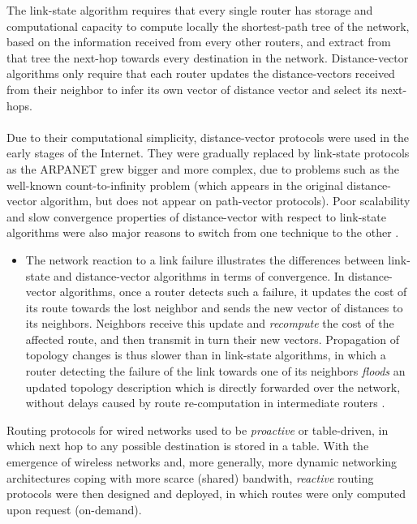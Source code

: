 The link-state algorithm requires that every single router has storage and computational capacity to compute locally the shortest-path tree of the network, based on the information received from every other routers, and extract from that tree the next-hop towards every destination in the network. Distance-vector algorithms only require that each router updates the distance-vectors received from their neighbor to infer its own vector of distance vector and select its next-hops. \ \\ \ \\
%
Due to their computational simplicity, distance-vector protocols were used in the early stages of the Internet. They were gradually replaced by link-state protocols as the ARPANET grew bigger and more complex, due to problems such as the well-known count-to-infinity problem \cite{tanenbaum} (which appears in the original distance-vector algorithm, but does not appear on path-vector protocols). Poor scalability and slow convergence properties of distance-vector with respect to link-state algorithms were also major reasons to switch from one technique to the other \cite{interconnections}.

\begin{itemize}
\item The network reaction to a link failure illustrates the differences between link-state and distance-vector algorithms in terms of convergence. In distance-vector algorithms, once a router detects such a failure, it updates the cost of its route towards the lost neighbor and sends the new vector of distances to its neighbors. Neighbors receive this update and {\em recompute} the cost of the affected route, and then transmit in turn their new vectors. Propagation of topology changes is thus slower than in link-state algorithms, in which a router detecting the failure of the link towards one of its neighbors {\em floods} an updated topology description which is directly forwarded over the network, without delays caused by route re-computation in intermediate routers \cite{interconnections}.
\end{itemize}

Routing protocols for wired networks used to be {\em proactive} or table-driven, in which next hop to any possible destination is stored in a table.  With the emergence of wireless networks and, more generally, more dynamic networking architectures coping with more scarce (shared) bandwith, {\em reactive} routing protocols were then designed and deployed, in which routes were only computed upon request (on-demand).

